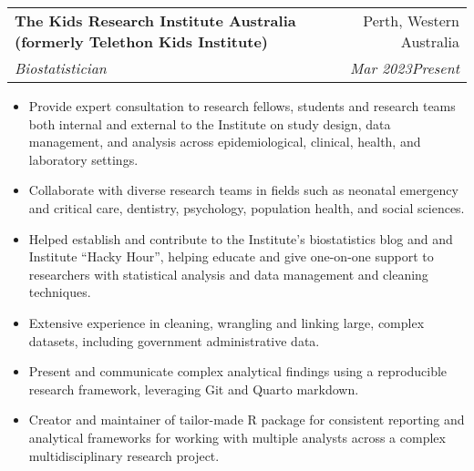 \documentclass[letterpaper,10.8pt]{article}
\makeatletter
\newcommand{\resumeItem}[2]{
  \item\small{
    \textbf{#1}{#2 \vspace{-2pt}}
  }
}
\newcommand{\resumeSubheading}[4]{
  \vspace{-1pt}\item
    \begin{tabular*}{0.97\textwidth}{l@{\extracolsep{\fill}}r}
      \textbf{#1} & #2 \\
      \textit{\small#3} & \textit{\small #4} \\
    \end{tabular*}\vspace{-5pt}
}
\newcommand{\resumeItemListStart}{\begin{itemize}}
\newcommand{\resumeItemListEnd}{\end{itemize}\vspace{-5pt}}
\makeatother
\begin{document}
    \resumeSubheading
    {The Kids Research Institute Australia (formerly Telethon Kids Institute)}{Perth, Western Australia}
    {Biostatistician}{Mar 2023\textendash Present}
    \resumeItemListStart
        \resumeItem{}{Provide expert consultation to research fellows, students and research teams \textemdash both internal and external to the Institute \textemdash on study design, data management, and analysis across epidemiological, clinical, health, and laboratory settings.}
        \resumeItem{}{Collaborate with diverse research teams in fields such as neonatal emergency and critical care, dentistry, psychology, population health, and social sciences.}
        \resumeItem{}{Helped establish and contribute to the Institute's biostatistics blog and and Institute ``Hacky Hour'', helping educate and give one-on-one support to researchers with statistical analysis and data management and cleaning techniques.}
        \resumeItem{}{Extensive experience in cleaning, wrangling and linking large, complex datasets, including government administrative data.}
        \resumeItem{}{Present and communicate complex analytical findings using a reproducible research framework, leveraging Git and Quarto markdown.}
        \resumeItem{}{Creator and maintainer of tailor-made R package for consistent reporting and analytical frameworks for working with multiple analysts across a complex multidisciplinary research project.}
    \resumeItemListEnd
    
\end{document}
